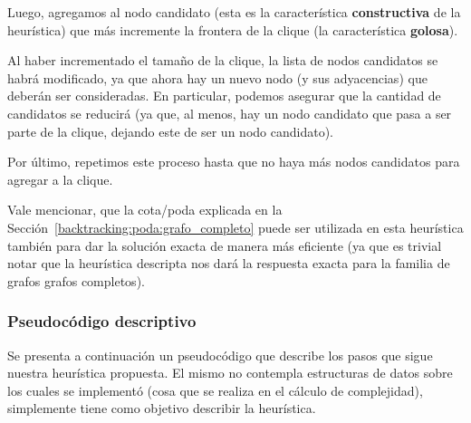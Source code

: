 \par Luego, agregamos al nodo candidato (esta es la caracter\'istica \textbf{constructiva}
    de la heur\'istica) que m\'as incremente la frontera de la clique (la
    caracter\'istica \textbf{golosa}).

\par Al haber incrementado el tama\~no de la clique, la lista de
    nodos candidatos se habr\'a modificado, ya que ahora hay un nuevo
    nodo (y sus adyacencias) que deber\'an ser consideradas. En particular,
    podemos asegurar que la cantidad de candidatos se reducir\'a (ya que,
    al menos, hay un nodo candidato que pasa a ser parte de la clique,
    dejando este de ser un nodo candidato).

\par Por \'ultimo, repetimos este proceso hasta que no haya m\'as
    nodos candidatos para agregar a la clique.

\par Vale mencionar, que la cota/poda \emph{}
    explicada en la Secci\'on~\ref{backtracking:poda:grafo_completo} puede
    ser utilizada en esta heur\'istica tambi\'en para dar la soluci\'on
    exacta de manera m\'as eficiente (ya que es trivial notar que la heur\'istica
    descripta nos dar\'a la respuesta exacta para la familia de grafos
    grafos completos).

\bigskip

\subsubsection{Pseudoc\'odigo descriptivo}
\par Se presenta a continuaci\'on un pseudoc\'odigo que describe los pasos que sigue
    nuestra heur\'istica propuesta. El mismo no contempla estructuras de datos sobre
    los cuales se implement\'o (cosa que se realiza en el c\'alculo de complejidad),
    simplemente tiene como objetivo describir la heur\'istica.

